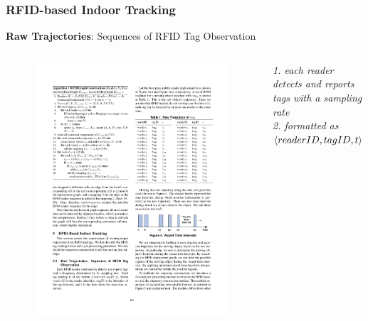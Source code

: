 \begin{frame}
\end{frame}


\begin{frame}
\frametitle{RFID-based Indoor Tracking}

  \small{\textbf{Raw Trajectories}: \textrm{Sequences of RFID Tag Observation}}

  \begin{columns}[c]

    \begin{figure}[tb]
      \includegraphics[width=\columnwidth]{figures/2-1/2-1-6.pdf}
    \end{figure}
    \scriptsize\textit{
      1. each reader detects and reports tags with a sampling rate \\
      2. formatted as $\mathnormal{\langle readerID, tagID, t \rangle}$
    }


\end{columns}
\end{frame}
